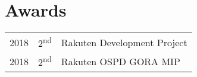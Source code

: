 \documentclass[letterpaper]{deedy-resume} %
\begin{document}
\begin{minipage}[t]{0.66\textwidth}

\section{Awards} 

\begin{tabular}{rll}
2018	 & 2\textsuperscript{nd} & Rakuten Development Project \\ 
2018	 & 2\textsuperscript{nd} & Rakuten OSPD GORA MIP\\
\end{tabular}


\end{minipage} %








\end{document}
